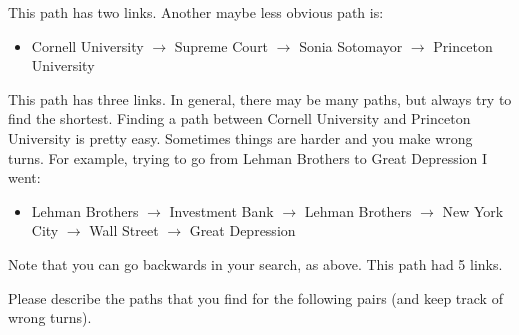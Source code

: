 \documentclass[addpoints]{exam}
\begin{document}
This path has two links.  Another maybe less obvious path is:
\begin{itemize}
\item Cornell University $\rightarrow$ Supreme Court $\rightarrow$ Sonia Sotomayor $\rightarrow$ Princeton University
\end{itemize}
This path has three links.  In general, there may be many paths, but always try to find the shortest.  Finding a path between Cornell University and Princeton University is pretty easy.  Sometimes things are harder and you make wrong turns.  For example, trying to go from Lehman Brothers to Great Depression I went:
\begin{itemize}
\item Lehman Brothers $\rightarrow$  Investment Bank $\rightarrow$ Lehman Brothers $\rightarrow$ New York City $\rightarrow$ Wall Street $\rightarrow$ Great Depression 
\end{itemize}

Note that you can go backwards in your search, as above.  This path had 5 links.

Please describe the paths that you find for the following pairs (and keep track of wrong turns).
\end{document}
